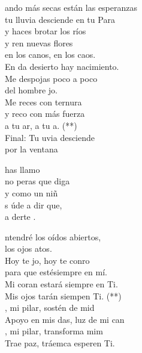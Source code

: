 \documentclass[12pt]{article}
\begin{document}
\begin{multicols*}{2}
\begin{cancion}%
	ando más secas están las esperanzas\\
	tu lluvia desciende en tu Para\\
	y haces brotar los ríos\\
	y ren nuevas flores\\
	en los canos, en los caos.\\
	En da desierto hay nacimiento.\\
Me despojas poco a poco \\
	del hombre jo.\\
	Me reces con ternura\\
	y reco con más fuerza\\
	a tu ar, a tu a. (**)\\
\jump
	Final: Tu uvia desciende \\
       por la ventana\\
\end{cancion}%

\begin{cancion}%
	  has llamo\\
	no peras que diga\\
	y como un niñ\\
	s úde a dir que, \\
	a derte .\\
\end{cancion}%

\begin{cancion}%
	ntendré los oídos abiertos,\\
	los ojos atos.\\
	Hoy te jo, hoy te conro\\
	para que estésiempre en mí.\\
	Mi coran estará siempre en Ti.\\
	Mis ojos tarán siempen Ti. (**)\\
\jump
	, mi pilar, sostén de mid\\
	Apoyo en mis das, luz de mi can\\
	, mi pilar, transforma mim\\
	Trae paz, tráemca esperen Ti.\\
\end{cancion}%


\end{multicols*}
\end{document}
